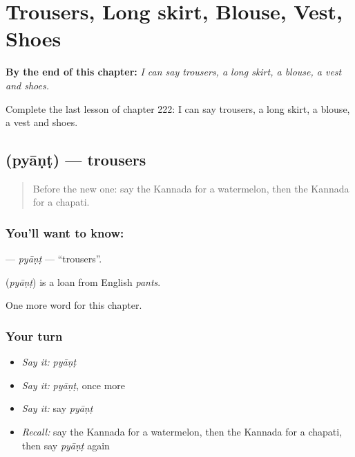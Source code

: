 
\chapter{Trousers, Long skirt, Blouse, Vest, Shoes}
\label{ch:ka-trousers-long-skirt-blouse-vest-shoes}

\begin{chapteropening}
\textbf{By the end of this chapter:} \emph{I can say trousers, a long skirt, a blouse, a vest and shoes.}

Complete the last lesson of chapter 222: I can say trousers, a long skirt, a blouse, a vest and shoes.
\end{chapteropening}

\section[\texorpdfstring{\kn{ಪ್ಯಾಂಟ್} (pyāṇṭ)}{ಪ್ಯಾಂಟ್ (pyāṇṭ)}]{ (pyāṇṭ) — trousers}

\label{lesson:KA-C222-pyant}



\begin{quote}
Before the new one: say the Kannada for a watermelon, then the Kannada for a chapati.
\end{quote}

\subsection*{You'll want to know: }
\textbf{} — \emph{pyāṇṭ} — \textquotedblleft{}trousers\textquotedblright{}.

\begin{cousinweb}
\textbf{} (\emph{pyāṇṭ}) is a loan from English \emph{pants}.
\end{cousinweb}

\begin{grammarlens}[title={What you've built}]
One more word for this chapter.
\end{grammarlens}

\subsection*{Your turn}
\begin{itemize}
\raggedright
  \item \emph{Say it:} \emph{pyāṇṭ}
  \item \emph{Say it:} \emph{pyāṇṭ}, once more
  \item \emph{Say it:} say \emph{pyāṇṭ}
  \item \emph{Recall:} say the Kannada for a watermelon, then the Kannada for a chapati, then say \emph{pyāṇṭ} again
\end{itemize}

